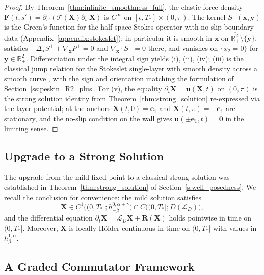 \documentclass{amsart}
\begin{document}
\begin{proof}
By Theorem~\ref{thm:infinite_smoothness_full}, the elastic force density
$\mathbf{F}(t,s') = \partial_{s'}(\mathcal{T}(\mathbf{X})\partial_{s'}\mathbf{X})$ is
$C^\infty$ on $[\epsilon,T_*] \times (0,\pi)$. The kernel $S^+(\mathbf{x},\mathbf{y})$
is the Green's function for the half-space Stokes operator with no-slip boundary
data (Appendix~\ref{appendix:stokeslet}); in particular it is smooth in
$\mathbf{x}$ on $\overline{\mathbb{R}^2_+}\setminus\{\mathbf{y}\}$, satisfies
$-\Delta_\mathbf{x} S^+ + \nabla_\mathbf{x} P^+ = 0$ and
$\nabla_\mathbf{x}\cdot S^+ = 0$ there, and vanishes on $\{x_2 = 0\}$ for
$\mathbf{y} \in \mathbb{R}^2_+$. Differentiation under the integral sign yields
(i), (ii), (iv); (iii) is the classical jump relation for the Stokeslet
single-layer with smooth density across a smooth curve
\cite{ladyzhenskaya1969mathematical}, with the sign and orientation matching the formulation of Section~\ref{ss:peskin_R2_plus}. For (v), the equality
$\partial_t \mathbf{X} = \mathbf{u}(\mathbf{X}, t)$ on $(0,\pi)$ is the strong
solution identity from Theorem~\ref{thm:strong_solution} re-expressed via the
layer potential; at the anchors $\mathbf{X}(t,0) = \mathbf{e}_1$ and
$\mathbf{X}(t,\pi) = -\mathbf{e}_1$ are stationary, and the no-slip condition
on the wall gives $\mathbf{u}(\pm\mathbf{e}_1, t) = \mathbf{0}$ in the limiting
sense.
\end{proof}


\subsection{Upgrade to a Strong Solution}

The upgrade from the mild fixed point to a classical strong solution was established in Theorem~\ref{thm:strong_solution} of Section~\ref{s:well_posedness}. We recall the conclusion for convenience: the mild solution satisfies
\[
\mathbf{X} \in C^1\bigl((0,T_*]; h^{0,\alpha+\gamma}_{-\beta}\bigr) \cap C\bigl((0,T_*]; D(\mathcal{L}_D)\bigr),
\]
and the differential equation $\partial_t \mathbf{X} = \mathcal{L}_D \mathbf{X} + \mathbf{R}(\mathbf{X})$ holds pointwise in time on $(0, T_*]$. Moreover, $\mathbf{X}$ is locally Hölder continuous in time on $(0,T_*]$ with values in $h^{1,\alpha}_\beta$.

\subsection{A Graded Commutator Framework}
\label{sec:commutator_framework}
\end{document}
